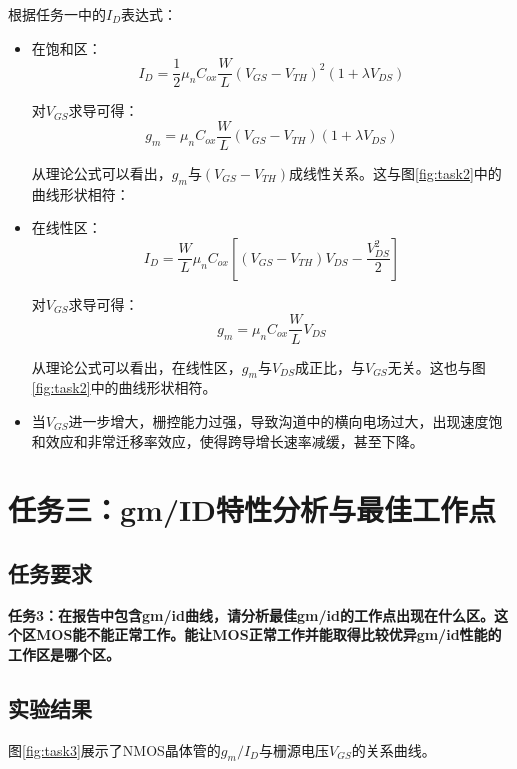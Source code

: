 \documentclass[UTF8,12pt,a4paper]{ctexart}
\begin{document}
根据任务一中的$I_D$表达式：
\begin{itemize}
  \item 在饱和区：
  \begin{equation}
  I_D = \frac{1}{2}\mu_n C_{ox}\frac{W}{L}(V_{GS}-V_{TH})^2(1+\lambda V_{DS})
  \end{equation}

  对$V_{GS}$求导可得：
  \begin{equation}
  g_m = \mu_n C_{ox}\frac{W}{L}(V_{GS}-V_{TH})(1+\lambda V_{DS})
  \end{equation}

  从理论公式可以看出，$g_m$与$(V_{GS}-V_{TH})$成线性关系。这与图\ref{fig:task2}中的曲线形状相符：

  \item 在线性区：
  \begin{equation}
  I_D = \frac{W}{L} \mu_n C_{ox}\left[(V_{GS}-V_{TH})V_{DS} - \frac{V_{DS}^2}{2}\right]
  \end{equation}

  对$V_{GS}$求导可得：
  \begin{equation}
  g_m = \mu_n C_{ox}\frac{W}{L}V_{DS}
  \end{equation}

  从理论公式可以看出，在线性区，$g_m$与$V_{DS}$成正比，与$V_{GS}$无关。这也与图\ref{fig:task2}中的曲线形状相符。

  \item 当$V_{GS}$进一步增大，栅控能力过强，导致沟道中的横向电场过大，出现速度饱和效应和非常迁移率效应，使得跨导增长速率减缓，甚至下降。
\end{itemize}

\newpage
\section{任务三：gm/ID特性分析与最佳工作点}

\subsection{任务要求}
\textbf{任务3：在报告中包含gm/id曲线，请分析最佳gm/id的工作点出现在什么区。这个区MOS能不能正常工作。能让MOS正常工作并能取得比较优异gm/id性能的工作区是哪个区。}

\subsection{实验结果}
图\ref{fig:task3}展示了NMOS晶体管的$g_m/I_D$与栅源电压$V_{GS}$的关系曲线。
\end{document}
